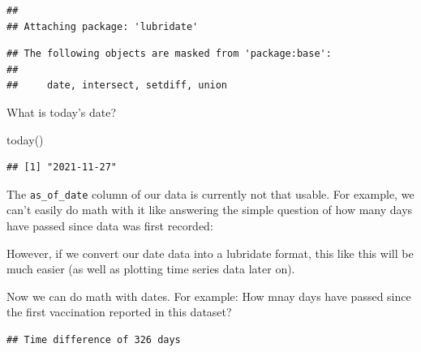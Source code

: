 \documentclass[
]{article}
\newenvironment{Shaded}{\begin{snugshade}}{\end{snugshade}}
\newcommand{\CommentTok}[1]{\textcolor[rgb]{0.56,0.35,0.01}{\textit{#1}}}
\newcommand{\DecValTok}[1]{\textcolor[rgb]{0.00,0.00,0.81}{#1}}
\newcommand{\FunctionTok}[1]{\textcolor[rgb]{0.00,0.00,0.00}{#1}}
\newcommand{\NormalTok}[1]{#1}
\newcommand{\OtherTok}[1]{\textcolor[rgb]{0.56,0.35,0.01}{#1}}
\newcommand{\SpecialCharTok}[1]{\textcolor[rgb]{0.00,0.00,0.00}{#1}}
\begin{document}
\begin{verbatim}
## 
## Attaching package: 'lubridate'
\end{verbatim}

\begin{verbatim}
## The following objects are masked from 'package:base':
## 
##     date, intersect, setdiff, union
\end{verbatim}

What is today's date?

\begin{Shaded}
\begin{Highlighting}[]
\FunctionTok{today}\NormalTok{()}
\end{Highlighting}
\end{Shaded}

\begin{verbatim}
## [1] "2021-11-27"
\end{verbatim}

The \texttt{as\_of\_date} column of our data is currently not that
usable. For example, we can't easily do math with it like answering the
simple question of how many days have passed since data was first
recorded:

However, if we convert our date data into a lubridate format, this like
this will be much easier (as well as plotting time series data later
on).

\begin{Shaded}
\end{Shaded}

Now we can do math with dates. For example: How mnay days have passed
since the first vaccination reported in this dataset?

\begin{Shaded}
\end{Shaded}

\begin{verbatim}
## Time difference of 326 days
\end{verbatim}
\end{document}
